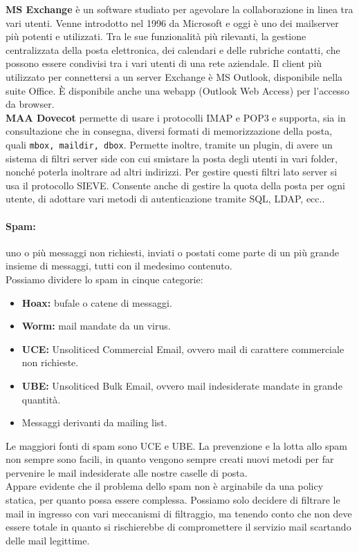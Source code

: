 \documentclass[a4paper]{report}
\begin{document}
\textbf{MS Exchange} è un software studiato per agevolare la collaborazione in linea tra vari utenti. Venne introdotto nel 1996 da Microsoft e oggi è uno dei mailserver più potenti e utilizzati. Tra le sue funzionalità più rilevanti, la gestione centralizzata della posta elettronica, dei calendari e delle rubriche contatti, che possono essere condivisi tra i vari utenti di una rete aziendale. Il client più utilizzato per connettersi a un server Exchange è MS Outlook, disponibile nella suite Office. È disponibile anche una webapp (Outlook Web Access) per l'accesso da browser.\\

\textbf{MAA Dovecot} permette di usare i protocolli IMAP e POP3 e supporta, sia in consultazione che in consegna, diversi formati di memorizzazione della posta, quali \texttt{mbox, maildir, dbox}. Permette inoltre, tramite un plugin, di avere un sistema di filtri server side con cui smistare la posta degli utenti in vari folder, nonché poterla inoltrare ad altri indirizzi. Per gestire questi filtri lato server si usa il protocollo SIEVE. Consente anche di gestire la quota della posta per ogni utente, di adottare vari metodi di autenticazione tramite SQL, LDAP, ecc..\\

\paragraph{Spam:} uno o più messaggi non richiesti, inviati o postati come parte di un più grande insieme di messaggi, tutti con il medesimo contenuto.\\
Possiamo dividere lo spam in cinque categorie:
\begin{itemize}
\item \textbf{Hoax:} bufale o catene di messaggi.
\item \textbf{Worm:} mail mandate da un virus.
\item \textbf{UCE:} Unsoliticed Commercial Email, ovvero mail di carattere commerciale non richieste.
\item \textbf{UBE:} Unsoliticed Bulk Email, ovvero mail indesiderate mandate in grande quantità.
\item Messaggi derivanti da mailing list.
\end{itemize}

Le maggiori fonti di spam sono UCE e UBE. La prevenzione e la lotta allo spam non sempre sono facili, in quanto vengono sempre creati nuovi metodi per far pervenire le mail indesiderate alle nostre caselle di posta.\\
Appare evidente che il problema dello spam non è arginabile da una policy statica, per quanto possa essere complessa. Possiamo solo decidere di filtrare le mail in ingresso con vari meccanismi di filtraggio, ma tenendo conto che non deve essere totale in quanto si rischierebbe di compromettere il servizio mail scartando delle mail legittime.\\
\end{document}

